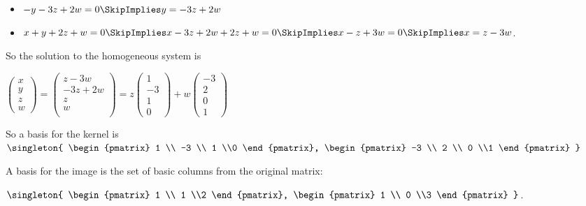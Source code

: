 \documentclass[oneside,12pt]{amsart}
\begin{document}
\begin{itemize}
\item $-y -3z + 2w = 0 \SkipImplies y = -3z + 2w$
\item $x + y +2z + w = 0 \SkipImplies x -3z + 2w + 2z + w = 0 \SkipImplies x-z+3w = 0 \SkipImplies x = z-3w$.
\end{itemize}


So the solution to the homogeneous system is

$
\begin{pmatrix}
x \\
y \\
z \\
w
\end{pmatrix}
=
\begin{pmatrix}
z-3w \\
-3z+2w \\
z \\
w \\
\end{pmatrix}
=
z
\begin{pmatrix}
1 \\ -3 \\ 1 \\0
\end{pmatrix}
+
w
\begin{pmatrix}
-3 \\ 2 \\ 0 \\1
\end{pmatrix}
$

So a basis for the kernel is
$\singleton{
\begin{pmatrix}
1 \\ -3 \\ 1 \\0
\end{pmatrix},
\begin{pmatrix}
-3 \\ 2 \\ 0 \\1
\end{pmatrix}
}$

A basis for the image is the set of basic columns from the original matrix:

$\singleton{
\begin{pmatrix}
1 \\ 1 \\2
\end{pmatrix},
\begin{pmatrix}
1 \\ 0 \\3
\end{pmatrix}
}$.
\end{document}
